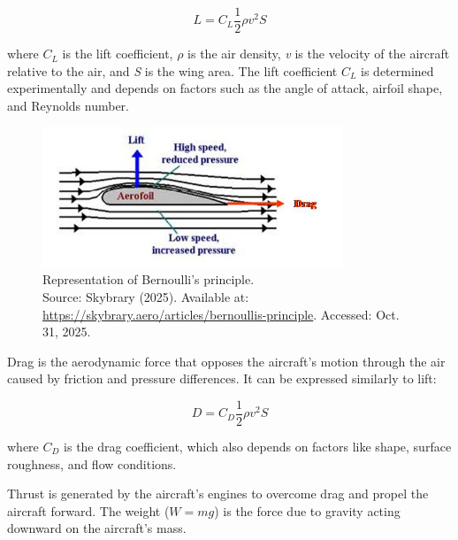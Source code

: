 \begin{equation}
    L = C_L \frac{1}{2} \rho v^2 S
\end{equation}

where $C_L$ is the lift coefficient, \textit{$\rho$} is the air density, \textit{v} is the velocity of the aircraft relative to the air, and \textit{S} is the wing area. The lift coefficient $C_L$ is determined experimentally and depends on factors such as the angle of attack, airfoil shape, and Reynolds number.

\begin{figure}[H]
    \centering
    \includegraphics[width=0.8\textwidth]{figures/bernoulli.jpg}
    \caption{Representation of Bernoulli's principle. \\ Source: Skybrary (2025). Available at: \url{https://skybrary.aero/articles/bernoullis-principle}. Accessed: Oct. 31, 2025.}
\end{figure}

Drag is the aerodynamic force that opposes the aircraft's motion through the air caused by friction and pressure differences. It can be expressed similarly to lift:

\begin{equation}
    D = C_D \frac{1}{2} \rho v^2 S
\end{equation}

where $C_D$ is the drag coefficient, which also depends on factors like shape, surface roughness, and flow conditions.

Thrust is generated by the aircraft's engines to overcome drag and propel the aircraft forward. The weight ($W = mg$) is the force due to gravity acting downward on the aircraft's mass.

